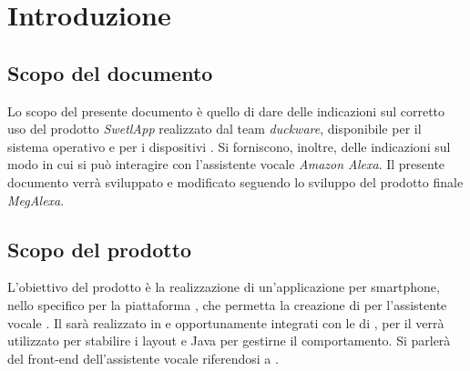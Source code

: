 \clearpage
\section{Introduzione}
\label{sec:sec_introduzione}
\subsection{Scopo del documento}
\label{sec:subsec_scopodocumento}
Lo scopo del presente documento è quello di dare delle indicazioni sul corretto uso del prodotto \textit{SwetlApp} realizzato dal team \textit{duckware}, disponibile per il sistema operativo  e per i dispositivi . Si forniscono, inoltre, delle indicazioni sul modo in cui si può interagire con l'assistente vocale \textit{Amazon Alexa}.
Il presente documento verrà sviluppato e modificato seguendo lo sviluppo del prodotto finale \textit{MegAlexa}.
\subsection{Scopo del prodotto}
\label{sec:subsec_scopoprodotto}


L'obiettivo del prodotto è la realizzazione di un'applicazione per smartphone, nello specifico per la piattaforma , che permetta la creazione di  per l'assistente vocale  . Il  sarà realizzato in  e  opportunamente integrati con le  di , per il  verrà utilizzato  per stabilire i layout e Java per gestirne il comportamento. Si parlerà del front-end dell'assistente vocale riferendosi a .

